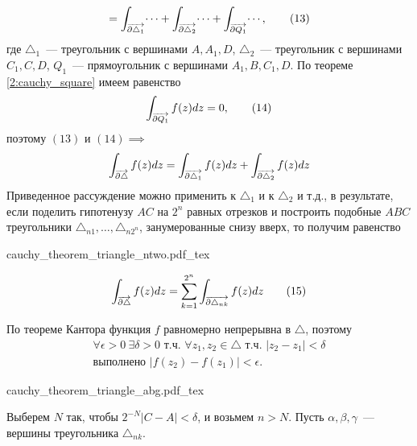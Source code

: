 \documentclass[main]{subfiles}
\begin{document}
\begin{longProof}
\begin{multline*}
        = \AnClOrInt[\AnClOrCurve[\partial \triangle_1]] \dotsi + \AnClOrInt[\AnClOrCurve[\partial \triangle_2]] \dotsi + \AnClOrInt[\AnClOrCurve[\partial Q_1]] \dotsi, \tag{13}
    \end{multline*}
    где $\triangle_1$~--- треугольник с вершинами $A, A_1, D$, $\triangle_2$~--- треугольник с вершинами $C_1, C, D$, $Q_1$~--- прямоугольник с вершинами $A_1, B, C_1, D$.
    По теореме \ref{2:cauchy_square} имеем равенство
    \[\AnClOrInt[\AnClOrCurve[\partial Q_1]] f(z) dz = 0, \tag{14}\]
    поэтому $(13)$ и $(14) \implies$
    \[ \AnClOrInt[\AnClOrCurve[\partial \triangle]] f(z) dz = \AnClOrInt[\AnClOrCurve[\partial \triangle_1]] f(z) dz + \AnClOrInt[\AnClOrCurve[\partial \triangle_2]] f(z) dz\]
    Приведенное рассуждение можно применить к $\triangle_1$ и к $\triangle_2$ и т.д., в результате, если поделить гипотенузу $AC$ на $2^n$ равных отрезков и построить подобные $ABC$ треугольники $\triangle_{n1}, \dotsc, \triangle_{n2^n}$, занумерованные снизу вверх, то получим равенство

    \begin{minipage}{0.3\textwidth}
        \begin{center}
            {cauchy_theorem_triangle_ntwo.pdf_tex}
        \end{center}
    \end{minipage}
    \begin{minipage}{0.6\textwidth}
        \[\AnClOrInt[\AnClOrCurve[\partial \triangle]] f(z) dz = \sum_{k=1}^{2^n} \AnClOrInt[\AnClOrCurve[\partial \triangle_{nk}]] f(z) dz \tag{15}\]
    \end{minipage}

    По теореме Кантора функция $f$ равномерно непрерывна в $\triangle$, поэтому
    \begin{multline*}
        \forall \epsilon > 0\ \exists \delta > 0 \text{ т.ч. } \forall z_1, z_2 \in \triangle \text{ т.ч. } |z_2 - z_1| < \delta \\
        \text{выполнено } |f(z_2) - f(z_1)| < \epsilon.
    \end{multline*}
    \begin{minipage}{0.45\textwidth}
        \begin{center}
            \def\svgwidth{0.5\textwidth}
            {cauchy_theorem_triangle_abg.pdf_tex}
        \end{center}
    \end{minipage}
    \begin{minipage}{0.45\textwidth}
        Выберем $N$ так, чтобы $2^{-N} |C - A| < \delta$, и возьмем $n > N$.
        Пусть $\alpha, \beta, \gamma$~--- вершины треугольника $\triangle_{nk}$.
    \end{minipage}


\end{longProof}
\end{document}
